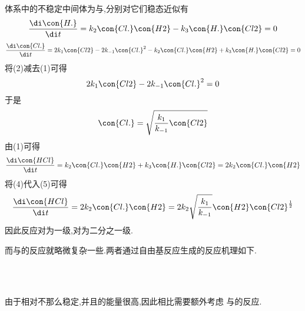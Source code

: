 \documentclass{ctexart}
\begin{document}
\begin{derivation}\setcounter{equation}{0}
    体系中的不稳定中间体为与,分别对它们稳态近似有
    \begin{equation}
        \dfrac{\di\con{H.}}{\di t}=k_2\con{Cl.}\con{H2}-k_3\con{H.}\con{Cl2}=0
    \end{equation}
    \begin{equation}
        \dfrac{\di\con{Cl.}}{\di t}=2k_1\con{Cl2}-2k_{-1}\con{Cl.}^2-k_2\con{Cl.}\con{H2}+k_3\con{H.}\con{Cl2}=0
    \end{equation}
    将(2)减去(1)可得
    \begin{equation}
        2k_1\con{Cl2}-2k_{-1}\con{Cl.}^2=0
    \end{equation}
    于是
    \begin{equation}
        \con{Cl.}=\sqrt{\dfrac{k_1}{k_{-1}}\con{Cl2}}
    \end{equation}
    由(1)可得
    \begin{equation}
        \dfrac{\di\con{HCl}}{\di t}=k_2\con{Cl.}\con{H2}+k_3\con{H.}\con{Cl2}=2k_2\con{Cl.}\con{H2}
    \end{equation}
    将(4)代入(5)可得
    \begin{equation}
        \dfrac{\di\con{HCl}}{\di t}=2k_2\con{Cl.}\con{H2}=2k_2\sqrt{\dfrac{k_1}{k_{-1}}}\con{H2}\con{Cl2}^{\frac12}
    \end{equation}
    因此反应对为一级,对为二分之一级.
\end{derivation}
而与的反应就略微复杂一些.两者通过自由基反应生成的反应机理如下.
\begin{tightcenter}
    \\
    \\
\end{tightcenter}
由于相对不那么稳定,并且的能量很高,因此相比需要额外考虑%
与的反应.
\end{document}
